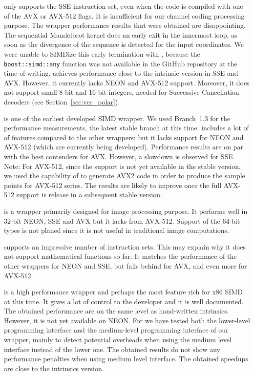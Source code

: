 \textbf{\BoostSIMD} only supports the SSE instruction set, even when the code is
compiled with one of the AVX or AVX-512 flags. It is insufficient for our
channel coding processing purpose. The \BoostSIMD wrapper performance results
that were obtained are disappointing. The sequential Mandelbrot kernel does an
early exit in the innermost loop, as soon as the divergence of the sequence is
detected for the input coordinates. We were unable to SIMDize this early
termination with \BoostSIMD, because the \verb|boost::simd::any| function was
not available in the GitHub repository at the time of writing. \textbf{\xsimd}
achieves performance close to the intrinsic version in SSE and AVX. However, it
currently lacks NEON and AVX-512 support. Moreover, it does not support small
8-bit and 16-bit integers, needed for Successive Cancellation decoders (see
Section~\ref{sec:vec_polar}).

\textbf{\Vc} is one of the earliest developed SIMD \Cxx wrapper. We used
Branch~1.3 for the performance measurements, the latest stable branch at this
time. \Vc includes a lot of of features compared to the other wrappers; but it
lacks support for NEON and AVX-512 (which are currently being developed).
Performance results are on par with the best contenders for AVX. However, a
slowdown is observed for SSE. Note: For AVX-512, since the support is not yet
available in the stable version, we used the capability of \Vc to generate AVX2
code in order to produce the sample points for AVX-512 series. The results are
likely to improve once the full AVX-512 support is release in a subsequent
stable version.

\textbf{\TSIMD} is a wrapper primarily designed for image processing purpose.
It performs well in 32-bit NEON, SSE and AVX but it lacks from AVX-512. Support
of the 64-bit types is not planed since it is not useful in traditional image
computations.

\textbf{\simdpp} supports an impressive number of instruction
sets. This may explain why it does not support mathematical functions so far. It
matches the performance of the other wrappers for NEON and SSE, but falls behind
for AVX, and even more for AVX-512.

\textbf{\VCL} is a high performance wrapper and perhaps the most feature rich
for x86 SIMD at this time. It gives a lot of control to the developer and it is
well documented. The obtained performance are on the same level as hand-written
intrinsics. However, it is not yet available on NEON.
For \MIPP we have tested both the lower-level programming interface and the
medium-level programming interface of our \MIPP wrapper, mainly to detect
potential overheads when using the medium level interface instead of the lower
one. The obtained results do not show any performance penalties when using \MIPP
medium level interface. The obtained speedups are close to the intrinsics
version.

